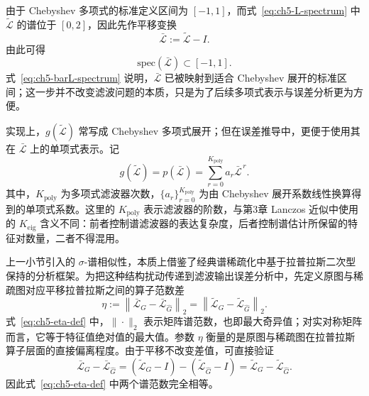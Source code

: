 由于 Chebyshev 多项式的标准定义区间为 $[-1,1]$，而式~\eqref{eq:ch5-L-spectrum} 中 $\tilde{\mathcal{L}}$ 的谱位于 $[0,2]$，因此先作平移变换
\begin{equation}
  \bar{\mathcal{L}}:=\tilde{\mathcal{L}}-I.
  \label{eq:ch5-barL-def}
\end{equation}
由此可得
\begin{equation}
  \mathrm{spec}(\bar{\mathcal{L}})\subset[-1,1].
  \label{eq:ch5-barL-spectrum}
\end{equation}
式~\eqref{eq:ch5-barL-spectrum} 说明，$\bar{\mathcal{L}}$ 已被映射到适合 Chebyshev 展开的标准区间；这一步并不改变滤波问题的本质，只是为了后续多项式表示与误差分析更为方便\cite{Hammond2011Wavelets,Shuman2013GSP}。

实现上，$g(\tilde{\mathcal{L}})$ 常写成 Chebyshev 多项式展开；但在误差推导中，更便于使用其在 $\bar{\mathcal{L}}$ 上的单项式表示。记
\begin{equation}
  g(\tilde{\mathcal{L}})
  =
  p(\bar{\mathcal{L}})
  =
  \sum_{r=0}^{K_{\text{poly}}} a_r \bar{\mathcal{L}}^{\,r}.
  \label{eq:ch5-poly-monomial}
\end{equation}
其中，$K_{\text{poly}}$ 为多项式滤波器次数，$\{a_r\}_{r=0}^{K_{\text{poly}}}$ 为由 Chebyshev 展开系数线性换算得到的单项式系数。这里的 $K_{\text{poly}}$ 表示滤波器的阶数，与第3章 Lanczos 近似中使用的 $K_{\text{eig}}$ 含义不同：前者控制谱滤波器的表达复杂度，后者控制谱估计所保留的特征对数量，二者不得混用。

上一小节引入的 $\sigma$-谱相似性，本质上借鉴了经典谱稀疏化中基于拉普拉斯二次型保持的分析框架\cite{Spielman2011EffectiveResistances,Spielman2011SpectralSparsification,Batson2013SpectralSparsificationSurvey}。为把这种结构扰动传递到滤波输出误差分析中，先定义原图与稀疏图对应平移拉普拉斯之间的算子范数差
\begin{equation}
  \eta
  :=
  \left\|
  \bar{\mathcal{L}}_{G}-\bar{\mathcal{L}}_{\hat{G}}
  \right\|_2
  =
  \left\|
  \tilde{\mathcal{L}}_{G}-\tilde{\mathcal{L}}_{\hat{G}}
  \right\|_2 .
  \label{eq:ch5-eta-def}
\end{equation}
式~\eqref{eq:ch5-eta-def} 中，$\|\cdot\|_2$ 表示矩阵谱范数，也即最大奇异值；对实对称矩阵而言，它等于特征值绝对值的最大值。参数 $\eta$ 衡量的是原图与稀疏图在拉普拉斯算子层面的直接偏离程度。由于平移不改变差值，可直接验证
\begin{equation}
  \bar{\mathcal{L}}_{G}-\bar{\mathcal{L}}_{\hat G}
  =
  (\tilde{\mathcal{L}}_{G}-I)-(\tilde{\mathcal{L}}_{\hat G}-I)
  =
  \tilde{\mathcal{L}}_{G}-\tilde{\mathcal{L}}_{\hat G}.
  \label{eq:ch5-shift-invariance}
\end{equation}
因此式~\eqref{eq:ch5-eta-def} 中两个谱范数完全相等。


